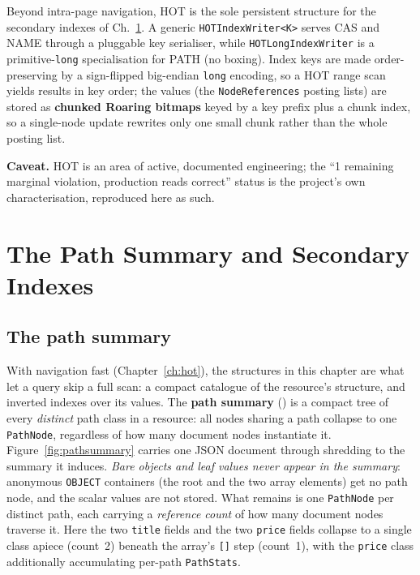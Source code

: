 \documentclass[11pt,a4paper,oneside]{report}
\theoremstyle{sirixthm}
\newcommand{\code}[1]{\texttt{#1}}
\begin{document}
Beyond intra-page navigation, HOT is the sole persistent structure for the secondary indexes of
Ch.~\ref{ch:pathsummary}. A generic \code{HOTIndexWriter<K>}
serves CAS and NAME through a pluggable key serialiser, while \code{HOTLongIndexWriter} is a
primitive-\code{long} specialisation for PATH (no boxing). Index keys are made order-preserving by a
sign-flipped big-endian \code{long} encoding, so a HOT range scan yields results in key order; the
values (the \code{NodeReferences} posting lists) are stored as \textbf{chunked Roaring bitmaps} keyed
by a key prefix plus a chunk index, so a single-node update rewrites only one small chunk rather than
the whole posting list.

\begin{honesty}
\small\textbf{Caveat.} HOT is an area of active, documented engineering; the ``1
remaining marginal violation, production reads correct'' status is the project's own
characterisation, reproduced here as such.
\end{honesty}

\chapter{The Path Summary and Secondary Indexes}
\label{ch:pathsummary}

\section{The path summary}
\label{sec:pathsummary}

With navigation fast (Chapter~\ref{ch:hot}), the structures in this chapter are what let a query
skip a full scan: a compact catalogue of the resource's structure, and inverted indexes over its
values. The \textbf{path summary} () is a compact tree of every
\emph{distinct} path class in a resource: all nodes sharing a path collapse to one \code{PathNode},
regardless of how many document nodes instantiate it. Figure~\ref{fig:pathsummary} carries one JSON
document through shredding to the summary it induces. \emph{Bare objects and leaf values never appear
in the summary}: anonymous \code{OBJECT} containers (the root and the two array elements) get no path
node, and the scalar values are not stored. What remains is one \code{PathNode} per distinct path,
each carrying a \emph{reference count} of how many document nodes traverse it. Here the two
\code{title} fields and the two \code{price} fields collapse to a single class apiece (count~2) beneath
the array's \code{[]} step (count~1), with the \code{price} class additionally accumulating per-path
\code{PathStats}.
\end{document}
